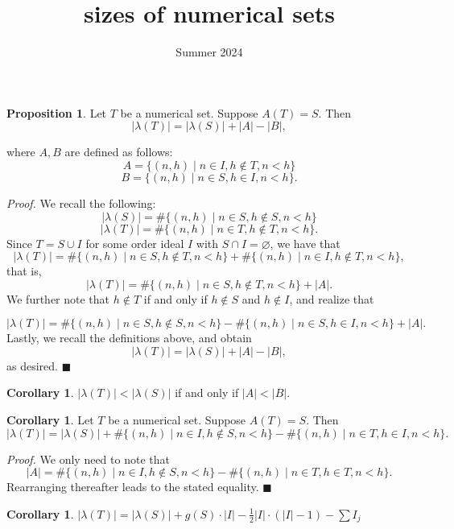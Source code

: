 \documentclass{article}
\title{sizes of numerical sets}
\date{Summer 2024}
\theoremstyle{definition}
\theoremstyle{definition}
\theoremstyle{definition}
\newtheorem{prop}[thm]{Proposition}
\newtheorem{corr}[thm]{Corollary}
\begin{document}
\maketitle

\begin{prop}
    Let $T$ be a numerical set. Suppose $A(T) = S$. Then 
    $$|\lambda(T)| = |\lambda(S)| + |A| - |B|,$$

    where $A, B$ are defined as follows: 
    $$A = \{(n, h)\mid n\in I, h\notin T, n <h\}$$
    $$ B = \{(n, h)\mid n \in S, h\in I, n <h \}.$$

    \textit{Proof.} We recall the following:
    $$|\lambda(S)| = \#\{(n, h) \mid n \in S, h\notin S, n<h\}$$
    $$|\lambda(T)| = \#\{(n, h)\mid n \in T, h\notin T, n<h\}.$$
    Since $T= S\cup I$ for some order ideal $I$ with $S \cap I = \varnothing$, we have that 
    $$|\lambda(T)| = \#\{(n,h)\mid n\in S, h\notin T, n<h\} + \#\{(n,h)\mid n\in I, h\notin T, n<h\},$$
that is, 
    $$|\lambda(T)| = \#\{(n,h)\mid n\in S, h\notin T, n<h\} + |A|.$$
We further note that $h \notin T$ if and only if $h\notin S$ and $h\notin I$, and realize that
    
    $$|\lambda(T)| = \#\{(n,h)\mid n\in S, h\notin S, n<h\} - \#\{(n, h)\mid n\in S, h\in I, n<h\} + |A|.$$
Lastly, we recall the definitions above, and obtain 
    $$|\lambda(T)| = |\lambda(S)| + |A| - |B|,$$
    as desired. $\blacksquare$
    
\end{prop}

\begin{corr}
    $|\lambda(T)| < |\lambda(S)|$ if and only if $|A| < |B|.$
\end{corr}

\begin{corr}
    Let $T$ be a numerical set. Suppose $A(T) = S$. Then 
    $$|\lambda(T)| = |\lambda(S)| + \#\{(n, h)\mid n\in I, h\notin S, n <h\} - \#\{(n, h)\mid n \in T, h\in I, n <h \}.$$

    \textit{Proof.} We only need to note that 
    $$|A| = \#\{(n, h) \mid n \in I, h \notin S, n<h\} - \#\{(n, h) \mid n\in T, h \in T, n< h\}.$$
    Rearranging thereafter leads to the stated equality. $\blacksquare$
\end{corr}

\begin{corr}
    $|\lambda(T)|=|\lambda(S)| + g(S)\cdot|I|-\frac{1}{2}|I|\cdot(|I|-1) - \sum I_j$
\end{corr}
\end{document}
